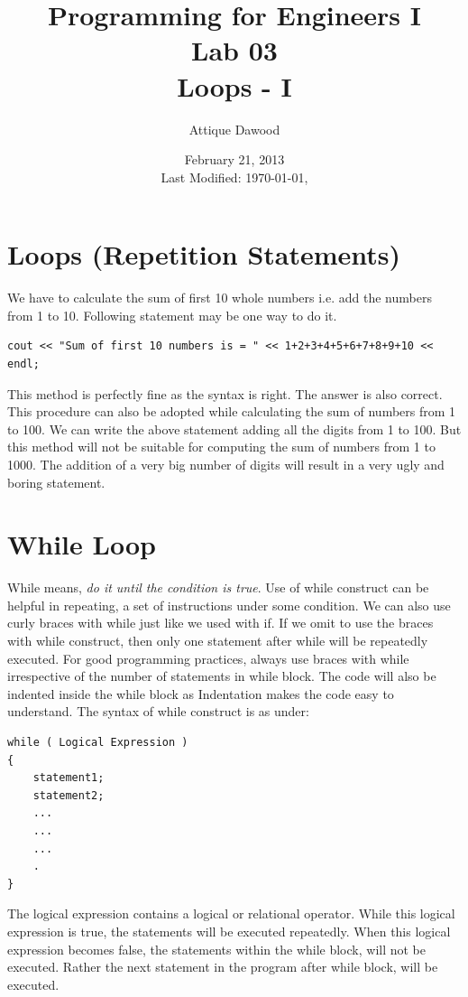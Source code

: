 \documentclass[12pt,a4paper]{article}
\title{\vspace{-1cm}Programming for Engineers I\\Lab 03\\Loops - I}
\author{Attique Dawood}
\date{February 21, 2013\\[0.2cm] Last Modified: \today, \currenttime}
\begin{document}
\maketitle

\section{Loops (Repetition Statements)}
We have to calculate the sum of first 10 whole numbers i.e. add the numbers from 1 to 10. Following statement may be one way to do it.
\begin{verbatim}
cout << "Sum of first 10 numbers is = " << 1+2+3+4+5+6+7+8+9+10 << endl;
\end{verbatim}
This method is perfectly fine as the syntax is right. The answer is also correct. This procedure can also be adopted while calculating the sum of numbers from 1 to 100. We can write the above statement adding all the digits from 1 to 100. But this method will not be suitable for computing the sum of numbers from 1 to 1000. The addition of a very big number of digits will result in a very ugly and boring statement. 

\section{While Loop}
While means, \emph{do it until the condition is true}. Use of while construct can be helpful in repeating, a set of instructions under some condition. We can also use curly braces with while just like we used with if. If we omit to use the braces with while construct, then only one statement after while will be repeatedly executed. For good programming practices, always use braces with while irrespective of the number of statements in while block. The code will also be indented inside the while block as Indentation makes the code easy to understand. 
The syntax of while construct is as under:
\begin{verbatim}
while ( Logical Expression )
{
    statement1;
    statement2;
    ...
    ...
    ...
    .
}
\end{verbatim}
The logical expression contains a logical or relational operator. While this logical expression is true, the statements will be executed repeatedly. When this logical expression becomes false, the statements within the while block, will not be executed. Rather the next statement in the program after while block, will be executed. 
\end{document}
